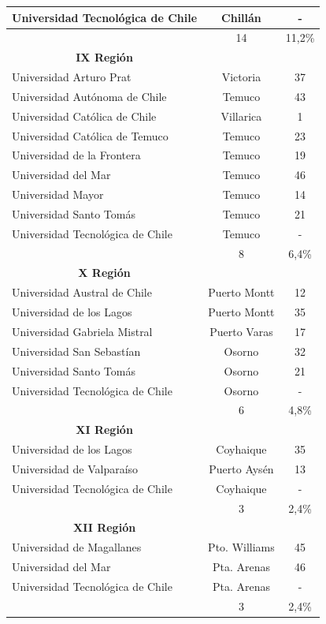 \begin{table}[htb!]
{\begin{tabular}{|l|c|c|}
	Universidad Tecnológica de Chile 	& Chillán 		& -\\
	\hline
	\textbf{\blue{Total}}			&14			&11,2\% \\
	\hline
	\multicolumn{1}{|c|}{\textbf{IX Región}}\\
	\hline
	Universidad Arturo Prat  		& Victoria		& 37\\
	Universidad Autónoma de Chile 		& Temuco		& 43\\
	Universidad Católica de Chile		& Villarica		& 1\\
	Universidad Católica de Temuco		& Temuco		& 23\\
	Universidad de la Frontera		& Temuco		& 19\\
	Universidad del Mar			& Temuco		& 46\\
	Universidad Mayor			& Temuco		& 14\\
	Universidad Santo Tomás			& Temuco		& 21\\
	Universidad Tecnológica de Chile	& Temuco		& -\\
	\hline
	\textbf{\blue{Total}}			&8			&6,4\% \\
	\hline
	\multicolumn{1}{|c|}{\textbf{X Región}}\\
	\hline
	Universidad Austral de Chile 		& Puerto Montt		& 12\\
	Universidad de los Lagos		& Puerto Montt 		& 35\\
	Universidad Gabriela Mistral 		& Puerto Varas 		& 17\\
	Universidad San Sebastían		& Osorno		& 32\\
	Universidad Santo Tomás 		& Osorno		& 21\\
	Universidad Tecnológica de Chile	& Osorno		& -\\
	\hline
	\textbf{\blue{Total}}			&6			&4,8\% \\
	\hline
	\multicolumn{1}{|c|}{\textbf{XI Región}}\\
	\hline
	Universidad de los Lagos 		& Coyhaique		& 35\\
	Universidad de Valparaíso		& Puerto Aysén		& 13\\
	Universidad Tecnológica de Chile	& Coyhaique		& -\\
	\hline
	\hline
	\textbf{\blue{Total}}			&3			&2,4\% \\
	\multicolumn{1}{|c|}{\textbf{XII Región}}\\
	\hline
	Universidad de Magallanes		& Pto. Williams		& 45\\
	Universidad del Mar			& Pta. Arenas		& 46\\
	Universidad Tecnológica de Chile	& Pta. Arenas		& -\\
	\hline
	\textbf{\blue{Total}}			&3			&2,4\% \\
	\hline
\end{tabular}}
\end{table}

